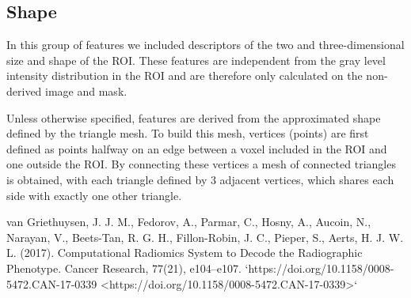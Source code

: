 \documentclass[12pt]{article}
\begin{document}
	\subsection{Shape}
In this group of features we included descriptors of the two and three-dimensional size and shape of the ROI. These features are independent from the gray level intensity distribution in the ROI and are therefore only calculated on the non-derived image and mask.

Unless otherwise specified, features are derived from the approximated shape defined by the triangle mesh. To build this mesh, vertices (points) are first defined as points halfway on an edge between a voxel included in the ROI and one outside the ROI. By connecting these vertices a mesh of connected triangles is obtained, with each triangle defined by 3 adjacent vertices, which shares each side with exactly one other triangle.

	\begin{thebibliography}{99}

van Griethuysen, J. J. M., Fedorov, A., Parmar, C., Hosny, A., Aucoin, N., Narayan, V., Beets-Tan, R. G. H., Fillon-Robin, J. C., Pieper, S., Aerts, H. J. W. L. (2017). Computational Radiomics System to Decode the Radiographic Phenotype. Cancer Research, 77(21), e104–e107. `https://doi.org/10.1158/0008-5472.CAN-17-0339 <https://doi.org/10.1158/0008-5472.CAN-17-0339>`

	\end{thebibliography}
\end{document}
